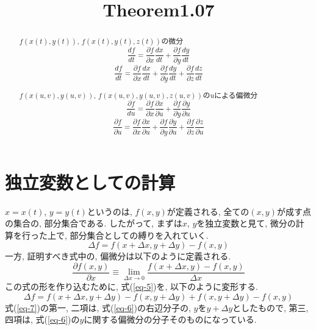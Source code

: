 \documentclass{jsarticle}
\title{Theorem1.07}
\begin{document}
\maketitle

\begin{abstract}
  $f(x(t), y(t))$, $f(x(t), y(t), z(t))$の微分
  \begin{equation}\label{eq-1}
    \frac{df}{dt} = \frac{\partial f}{\partial x}\frac{dx}{dt} 
    + \frac{\partial f}{\partial y}\frac{dy}{dt}
  \end{equation}
  \begin{equation}
    \frac{df}{dt} = \frac{\partial f}{\partial x}\frac{dx}{dt} 
    + \frac{\partial f}{\partial y}\frac{dy}{dt}
    + \frac{\partial f}{\partial z}\frac{dz}{dt}
  \end{equation}

  $f(x(u, v), y(u, v))$, $f(x(u, v), y(u, v), z(u, v))$の$u$による偏微分
  \begin{equation}\label{eq-3}
    \frac{\partial f}{du} = \frac{\partial f}{\partial x}\frac{\partial x}{\partial u} 
    + \frac{\partial f}{\partial y}\frac{\partial y}{\partial u}
  \end{equation}
  \begin{equation}
    \frac{\partial f}{\partial u} = \frac{\partial f}{\partial x}\frac{\partial x}{\partial u} 
    + \frac{\partial f}{\partial y}\frac{\partial y}{\partial u}
    + \frac{\partial f}{\partial z}\frac{\partial z}{\partial u}
  \end{equation}
\end{abstract}

\section{独立変数としての計算}\label{sec-1}
$x = x(t)$, $y = y(t)$というのは, $f(x, y)$が定義される, 全ての$(x, y)$が成す点の集合の, 部分集合である. 
したがって, まずは$x$, $y$を独立変数と見て, 微分の計算を行った上で, 部分集合としての縛りを入れていく. 
\begin{equation}\label{eq-5}
  \Delta f = f(x + \Delta x, y + \Delta y) - f(x, y)
\end{equation}
一方, 証明すべき式中の, 偏微分は以下のように定義される. 
\begin{equation}\label{eq-6}
  \frac{\partial f(x, y)}{\partial x} \equiv \lim_{\Delta x \to 0}\frac{f(x + \Delta x, y) - f(x, y)}{\Delta x}
\end{equation}
この式の形を作り込むために, 式(\ref{eq-5})を, 以下のように変形する. 
\begin{equation}\label{eq-7}
  \Delta f = f(x + \Delta x, y + \Delta y) - f(x, y + \Delta y) + f(x, y + \Delta y) - f(x, y)
\end{equation}
式(\ref{eq-7})の第一, 二項は, 式(\ref{eq-6})の右辺分子の, $y$を$y + \Delta y$としたもので, 第三, 四項は, 式(\ref{eq-6})の$y$に関する偏微分の分子そのものになっている. 
\end{document}
